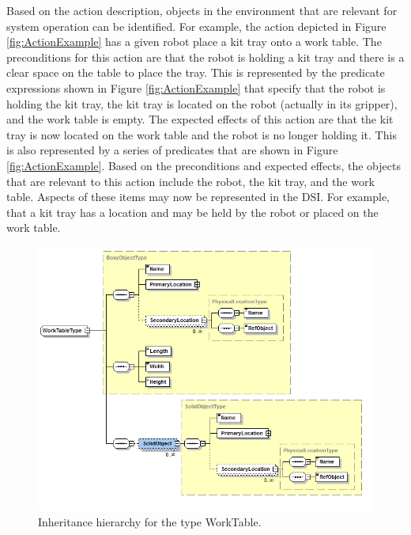 Based on the action description, objects in the environment that are relevant
for system operation can be identified. For example, the action depicted in Figure \ref{fig:ActionExample}
has a given robot place a kit tray onto a work table. The preconditions for this action are that
the robot is holding a kit tray and there is a clear space on the table to place the tray. This is
represented by the predicate expressions shown in Figure \ref{fig:ActionExample} that specify that
the robot is holding the kit tray, the kit tray is located on the robot (actually in its gripper), and
the work table is empty. The expected effects of this action are that the kit tray is now located
on the work table and the robot is no longer holding it. This is also represented by a series
of predicates that are shown in Figure \ref{fig:ActionExample}. Based on the preconditions and expected effects,
the objects that are relevant to this action include the robot, the kit tray, and the work table.
Aspects of these items may now be represented in the DSI. For example, that a kit tray has a location and may
be held by the robot or placed on the work table.

\begin{figure}[ht!]
\begin{center}
\includegraphics[width=13cm]{images/worktable.jpg}
\caption{Inheritance hierarchy for the type WorkTable.}
\label{fig:worktable}
\end{center}
\end{figure}

